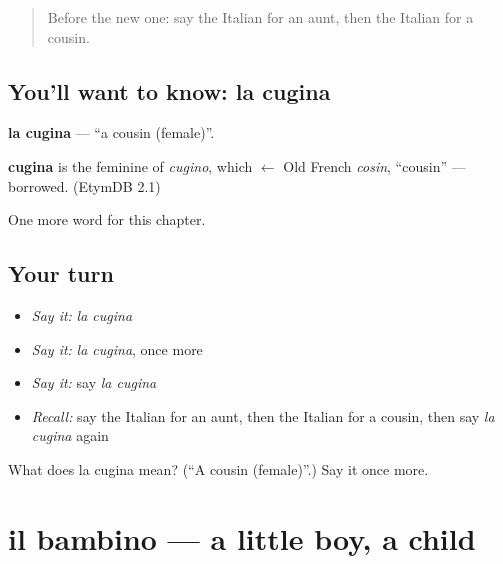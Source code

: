 \label{lesson:IT-C45-cugina}



\begin{quote}
Before the new one: say the Italian for an aunt, then the Italian for a cousin.
\end{quote}

\subsection*{You'll want to know: la cugina}
\textbf{la cugina} — \textquotedblleft{}a cousin (female)\textquotedblright{}.

\begin{cousinweb}
\textbf{cugina} is the feminine of \emph{cugino}, which $\leftarrow$ Old French \emph{cosin}, \textquotedblleft{}cousin\textquotedblright{} — borrowed. (EtymDB 2.1)
\end{cousinweb}

\begin{grammarlens}[title={What you've built}]
One more word for this chapter.
\end{grammarlens}

\subsection*{Your turn}
\begin{itemize}
\raggedright
  \item \emph{Say it:} \emph{la cugina}
  \item \emph{Say it:} \emph{la cugina}, once more
  \item \emph{Say it:} say \emph{la cugina}
  \item \emph{Recall:} say the Italian for an aunt, then the Italian for a cousin, then say \emph{la cugina} again
\end{itemize}

\begin{tcolorbox}[breakable,colback=teal!4,colframe=teal!35!black,title={Before you move on}]
What does la cugina mean? (\textquotedblleft{}A cousin (female)\textquotedblright{}.) Say it once more.
\end{tcolorbox}
\section[il bambino]{il bambino — a little boy, a child}

\label{lesson:IT-C45-bambino}



